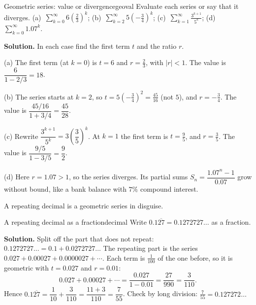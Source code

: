 \documentclass[11pt]{article}
\begin{document}
\begin{exmp}{Geometric series: value or divergence}{geoval}
Evaluate each series or say that it diverges. (a)~$\displaystyle\sum_{k=0}^\infty6\left(\frac23\right)^k$; \quad (b)~$\displaystyle\sum_{k=2}^\infty5\left(-\frac34\right)^k$; \quad (c)~$\displaystyle\sum_{k=1}^\infty\frac{3^{k+1}}{5^k}$; \quad (d)~$\displaystyle\sum_{k=0}^\infty1.07^k$.

\textbf{Solution.} In each case find the first term $t$ and the ratio $r$.

(a) The first term (at $k=0$) is $t=6$ and $r=\frac23$, with $|r|<1$. The value is $\dfrac{6}{1-2/3}=18$.

(b) The series starts at $k=2$, so $t=5\left(-\frac34\right)^2=\frac{45}{16}$ (not $5$), and $r=-\frac34$. The value is $\dfrac{45/16}{1+3/4}=\dfrac{45}{28}$.

(c) Rewrite $\dfrac{3^{k+1}}{5^k}=3\left(\dfrac35\right)^k$. At $k=1$ the first term is $t=\frac95$, and $r=\frac35$. The value is $\dfrac{9/5}{1-3/5}=\dfrac92$.

(d) Here $r=1.07>1$, so the series diverges. Its partial sums $S_n=\dfrac{1.07^n-1}{0.07}$ grow without bound, like a bank balance with $7\%$ compound interest.
\end{exmp}

A repeating decimal is a geometric series in disguise.

\begin{exmp}{A repeating decimal as a fraction}{decimal}
Write $0.1\overline{27}=0.1272727\ldots$ as a fraction.

\textbf{Solution.} Split off the part that does not repeat: $0.1272727\ldots=0.1+0.0272727\ldots$ The repeating part is the series $0.027+0.00027+0.0000027+\cdots$. Each term is $\frac1{100}$ of the one before, so it is geometric with $t=0.027$ and $r=0.01$:
\[
0.027+0.00027+\cdots=\frac{0.027}{1-0.01}=\frac{27}{990}=\frac3{110}.
\]
Hence $0.1\overline{27}=\dfrac1{10}+\dfrac3{110}=\dfrac{11+3}{110}=\dfrac7{55}$. Check by long division: $\frac7{55}=0.127272\ldots$
\end{exmp}
\end{document}
